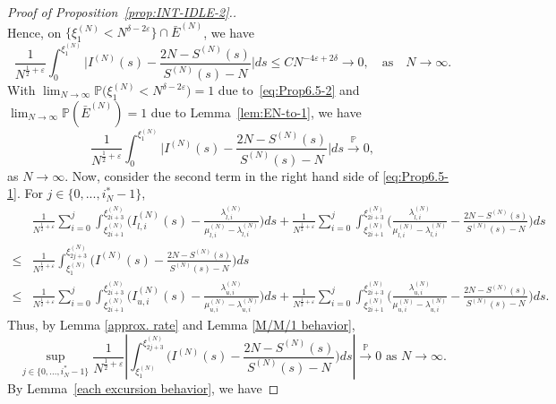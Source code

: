 \documentclass[11pt, reqno]{article}
\numberwithin{equation}{section}
\numberwithin{theorem}{section}
\newcommand{\pto}{\ensuremath{\xrightarrow{\ \mathbb{P}\ }}}  %
\begin{document}
\begin{proof}[Proof of Proposition~\ref{prop:INT-IDLE-2}.]
\begin{equation}
\end{equation}
Hence, on 
$\big\{\xi^{(N)}_1<N^{\delta-2\varepsilon}\big\}\cap \bar{E}^{(N)}$,  
we have \begin{equation*}
     \frac{1}{N^{\frac{1}{2}+\varepsilon}}\int_0^{\xi^{(N)}_1}\Big|I^{(N)}(s)-\frac{2N-S^{(N)}(s)}{S^{(N)}(s)-N}\Big|ds\leq C N^{-4\varepsilon+2\delta}\to 0, \quad\text{as}\quad N\to\infty.
\end{equation*}
With $\lim_{N\rightarrow\infty}\mathbb{P}\big(\xi^{(N)}_1< N^{\delta-2\varepsilon}\big)=1$ due to~\eqref{eq:Prop6.5-2} and $\lim_{N\to\infty}\mathbb{P}(\bar{E}^{(N)})=1$ due to Lemma~\ref{lem:EN-to-1}, we have
\begin{equation}\label{eq:Prop6.5-3}
     \frac{1}{N^{\frac{1}{2}+\varepsilon}}\int_0^{\xi^{(N)}_1}\Big|I^{(N)}(s)-\frac{2N-S^{(N)}(s)}{S^{(N)}(s)-N}\Big|ds\pto0,
\end{equation}
as $N\to\infty$.
Now, consider the second term in the right hand side of \eqref{eq:Prop6.5-1}. For $j\in\{0,...,i^*_N-1\}$,
\begin{align*}
    &\frac{1}{N^{\frac{1}{2}+\varepsilon}}\sum_{i=0}^{j}\int_{\xi^{(N)}_{2i+1}}^{\xi^{(N)}_{2i+3}}\Big(I^{(N)}_{l,i}(s)-\frac{\lambda^{(N)}_{l,i}}{\mu^{(N)}_{l,i}-\lambda^{(N)}_{l,i}}\Big)ds+ \frac{1}{N^{\frac{1}{2}+\varepsilon}}\sum_{i=0}^{j}\int_{\xi^{(N)}_{2i+1}}^{\xi^{(N)}_{2i+3}} \Big(\frac{\lambda^{(N)}_{l,i}}{\mu^{(N)}_{l,i}-\lambda^{(N)}_{l,i}}-\frac{2N-S^{(N)}(s)}{S^{(N)}(s)-N}\Big)ds\\
    \leq & \frac{1}{N^{\frac{1}{2}+\varepsilon}}\int_{\xi^{(N)}_1}^{\xi^{(N)}_{2j+3}}\Big(I^{(N)}(s)-\frac{2N-S^{(N)}(s)}{S^{(N)}(s)-N}\Big)ds\\
    \leq & \frac{1}{N^{\frac{1}{2}+\varepsilon}}\sum_{i=0}^{j}\int_{\xi^{(N)}_{2i+1}}^{\xi^{(N)}_{2i+3}}\Big(I^{(N)}_{u,i}(s)-\frac{\lambda^{(N)}_{u,i}}{\mu^{(N)}_{u,i}-\lambda^{(N)}_{u,i}}\Big)ds+ \frac{1}{N^{\frac{1}{2}+\varepsilon}}\sum_{i=0}^{j}\int_{\xi^{(N)}_{2i+1}}^{\xi^{(N)}_{2i+3}} \Big(\frac{\lambda^{(N)}_{u,i}}{\mu^{(N)}_{u,i}-\lambda^{(N)}_{u,i}}-\frac{2N-S^{(N)}(s)}{S^{(N)}(s)-N}\Big)ds.
\end{align*}
Thus, by Lemma \ref{approx. rate} and Lemma \ref{M/M/1 behavior}, 
\begin{equation}\label{eq 12}
    \sup_{j\in\{0,...,i^*_N-1\}}\frac{1}{N^{\frac{1}{2}+\varepsilon}}\left|\int_{\xi^{(N)}_1}^{\xi^{(N)}_{2j+3}}\Big(I^{(N)}(s)-\frac{2N-S^{(N)}(s)}{S^{(N)}(s)-N}\Big)ds\right|\pto0\text{ as }N\rightarrow\infty .
\end{equation}
By Lemma~\ref{each excursion behavior}, we have 

\end{proof}
\end{document}
